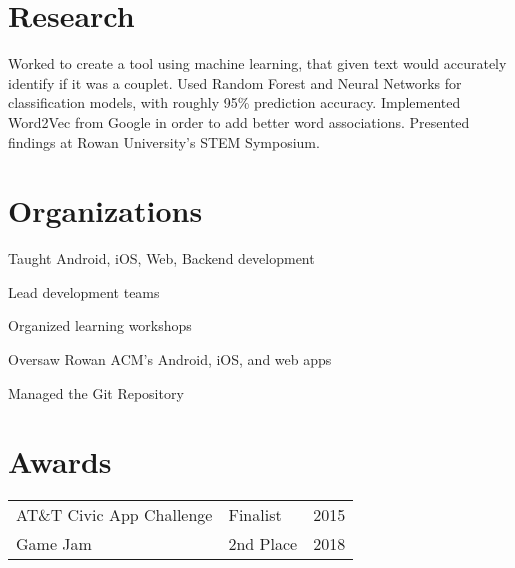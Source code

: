 \documentclass[]{johns_resume_style}
\begin{document}
\begin{minipage}[t]{0.68\textwidth}

\section{Research}
\justify \unskip\parfillskip 0pt \par Worked to create a tool using machine learning, that  given text would accurately identify if it was a couplet. Used Random Forest and Neural Networks for classification models, with roughly 95\% prediction accuracy. Implemented Word2Vec from Google in order to add better word associations. Presented findings at Rowan University's STEM Symposium.
\sectionsep

\section{Organizations} 
\noindent{}
\begin{tightemize}
    \item Taught Android, iOS, Web, Backend development
    \item Lead development teams
    \item Organized learning workshops
    \item Oversaw Rowan ACM's Android, iOS, and web apps
    \item Managed the Git Repository
\end{tightemize}
\sectionsep





\section{Awards} 
\begin{tabular}{p{5cm}p{5cm}p{5cm}}
 AT\&T Civic App Challenge	     & Finalist        & 2015 \\
Game Jam         & 2nd Place    & 2018
\end{tabular}
\sectionsep


\end{minipage}
\end{document}
